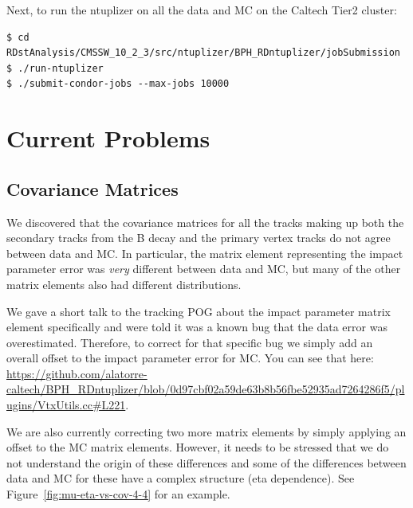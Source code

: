 \documentclass[12pt]{report}
\begin{document}
Next, to run the ntuplizer on all the data and MC on the Caltech Tier2 cluster:
\begin{mdframed}[backgroundcolor=light-gray, roundcorner=10pt,leftmargin=1, rightmargin=1, innerleftmargin=15, innertopmargin=15,innerbottommargin=15, outerlinewidth=1, linecolor=light-gray,roundcorner=20pt]
\begin{lstlisting}
$ cd RDstAnalysis/CMSSW_10_2_3/src/ntuplizer/BPH_RDntuplizer/jobSubmission
$ ./run-ntuplizer
$ ./submit-condor-jobs --max-jobs 10000
\end{lstlisting}
\end{mdframed}

\chapter{Current Problems}
\section{Covariance Matrices}
We discovered that the covariance matrices for all the tracks making up both
the secondary tracks from the B decay and the primary vertex tracks do not
agree between data and MC. In particular, the matrix element representing the
impact parameter error was \emph{very} different between data and MC, but many
of the other matrix elements also had different distributions.

We gave a short talk to the tracking POG about the impact parameter matrix
element specifically and were told it was a known bug that the data error was
overestimated. Therefore, to correct for that specific bug we simply add an
overall offset to the impact parameter error for MC. You can see that here:
\url{https://github.com/alatorre-caltech/BPH_RDntuplizer/blob/0d97cbf02a59de63b8b56fbe52935ad7264286f5/plugins/VtxUtils.cc#L221}.

We are also currently correcting two more matrix elements by simply applying an
offset to the MC matrix elements. However, it needs to be stressed that we do
not understand the origin of these differences and some of the differences
between data and MC for these have a complex structure (eta dependence). See
Figure~\ref{fig:mu-eta-vs-cov-4-4} for an example.
\end{document}
